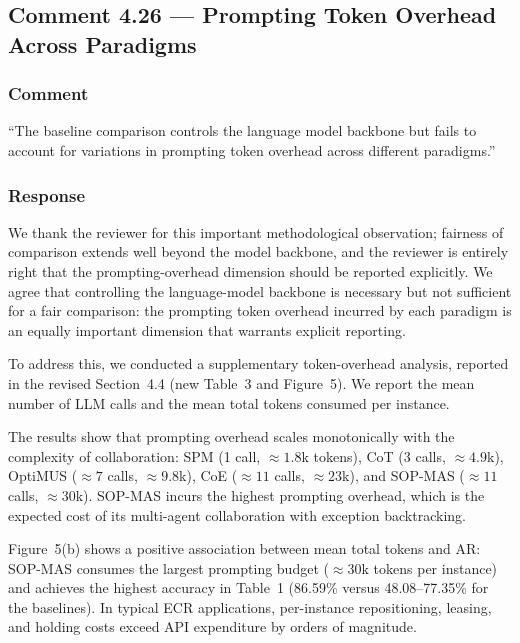 \documentclass[11pt,a4paper]{article}
\begin{document}
\subsection{Comment 4.26 --- Prompting Token Overhead Across Paradigms}

\subsubsection{Comment}
``The baseline comparison controls the language model backbone but fails to account for variations in prompting token overhead across different paradigms.''

\subsubsection{Response}
We thank the reviewer for this important methodological observation; fairness of comparison extends well beyond the model backbone, and the reviewer is entirely right that the prompting-overhead dimension should be reported explicitly. We agree that controlling the language-model backbone is necessary but not sufficient for a fair comparison: the prompting token overhead incurred by each paradigm is an equally important dimension that warrants explicit reporting.

To address this, we conducted a supplementary token-overhead analysis, reported in the revised Section~4.4 (new Table~3 and Figure~5). We report the mean number of LLM calls and the mean total tokens consumed per instance.

The results show that prompting overhead scales monotonically with the complexity of collaboration: SPM (1 call, ${\approx}1.8$k tokens), CoT (3 calls, ${\approx}4.9$k), OptiMUS (${\approx}7$ calls, ${\approx}9.8$k), CoE (${\approx}11$ calls, ${\approx}23$k), and SOP-MAS (${\approx}11$ calls, ${\approx}30$k). SOP-MAS incurs the highest prompting overhead, which is the expected cost of its multi-agent collaboration with exception backtracking.

Figure~5(b) shows a positive association between mean total tokens and AR: SOP-MAS consumes the largest prompting budget (${\approx}30$k tokens per instance) and achieves the highest accuracy in Table~1 (86.59\% versus 48.08--77.35\% for the baselines). In typical ECR applications, per-instance repositioning, leasing, and holding costs exceed API expenditure by orders of magnitude.
\end{document}
